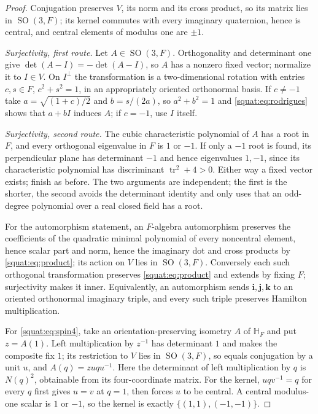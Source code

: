 \documentclass[11pt,letterpaper]{article}
\numberwithin{equation}{section}
\theoremstyle{definition}
\theoremstyle{remark}
\newcommand{\HF}{\mathbb H_F}
\newcommand{\ii}{\mathbf i}
\newcommand{\jj}{\mathbf j}
\newcommand{\kk}{\mathbf k}
\newcommand{\tr}{\operatorname{tr}}
\newcommand{\SO}{\operatorname{SO}}
\begin{document}
\begin{proof}
Conjugation preserves $V$, its norm and its cross product, so its matrix lies in
$\SO(3,F)$; its kernel commutes with every imaginary quaternion, hence is central, and
central elements of modulus one are $\pm1$.

\emph{Surjectivity, first route.} Let $A\in\SO(3,F)$. Orthogonality and determinant one
give $\det(A-I)=-\det(A-I)$, so $A$ has a nonzero fixed vector; normalize it to $I\in V$.
On $I^\perp$ the transformation is a two-dimensional rotation with entries $c,s\in F$,
$c^2+s^2=1$, in an appropriately oriented orthonormal basis. If $c\ne-1$ take
$a=\sqrt{(1+c)/2}$ and $b=s/(2a)$, so $a^2+b^2=1$ and \cref{squat:eq:rodrigues} shows
that $a+bI$ induces $A$; if $c=-1$, use $I$ itself.

\emph{Surjectivity, second route.} The cubic characteristic polynomial of $A$ has a root
in $F$, and every orthogonal eigenvalue in $F$ is $1$ or $-1$. If only a $-1$ root is
found, its perpendicular plane has determinant $-1$ and hence eigenvalues $1,-1$, since
its characteristic polynomial has discriminant $\tr^2+4>0$. Either way a fixed vector
exists; finish as before. The two arguments are independent; the first is the shorter, the
second avoids the determinant identity and only uses that an odd-degree polynomial over a
real closed field has a root.

For the automorphism statement, an $F$-algebra automorphism preserves the coefficients of
the quadratic minimal polynomial of every noncentral element, hence scalar part and norm,
hence the imaginary dot and cross products by \cref{squat:eq:product}; its action on $V$
lies in $\SO(3,F)$. Conversely each such orthogonal transformation preserves
\cref{squat:eq:product} and extends by fixing $F$; surjectivity makes it inner.
Equivalently, an automorphism sends $\ii,\jj,\kk$ to an oriented orthonormal imaginary
triple, and every such triple preserves Hamilton multiplication.

For \cref{squat:eq:spin4}, take an orientation-preserving isometry $A$ of $\HF$ and put
$z=A(1)$. Left multiplication by $z^{-1}$ has determinant $1$ and makes the composite fix
$1$; its restriction to $V$ lies in $\SO(3,F)$, so equals conjugation by a unit $u$, and
$A(q)=zuqu^{-1}$. Here the determinant of left multiplication by $q$ is $N(q)^2$,
obtainable from its four-coordinate matrix. For the kernel, $uqv^{-1}=q$ for
every $q$ first gives $u=v$ at $q=1$, then forces $u$ to be central. A central
modulus-one scalar is $1$ or $-1$, so the kernel is exactly
$\{(1,1),(-1,-1)\}$.
\end{proof}
\end{document}
